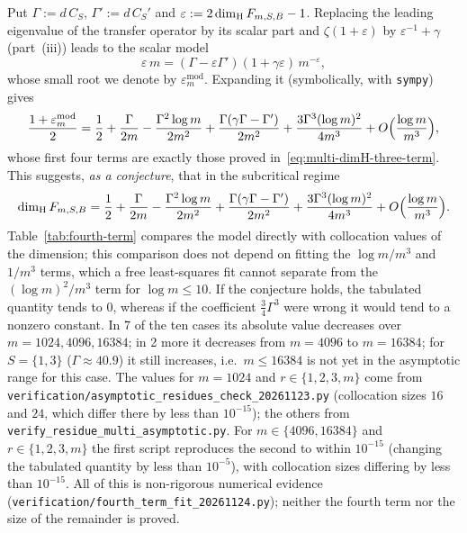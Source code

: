 \begin{remark}\label{rem:fourth-term}
Put $\Gamma:=d\,C_S$, $\Gamma':=d\,C_S'$ and $\varepsilon:=2\dim_{\mathrm{H}} F_{m,S,B}-1$. Replacing the
leading eigenvalue of the transfer operator by its scalar part and $\zeta(1+\varepsilon)$ by
$\varepsilon^{-1}+\gamma$ (part~(iii)) leads to the scalar model
\[
\varepsilon\,m=(\Gamma-\varepsilon\Gamma')(1+\gamma\varepsilon)\,m^{-\varepsilon},
\]
whose small root we denote by $\varepsilon_m^{\mathrm{mod}}$. Expanding it (symbolically, with
\texttt{sympy}) gives
\[
\frac{1+\varepsilon_m^{\mathrm{mod}}}{2}=\frac12+\frac{\Gamma}{2m}-\frac{\Gamma^2\log m}{2m^2}
+\frac{\Gamma(\gamma\Gamma-\Gamma')}{2m^2}+\frac{3\Gamma^3(\log m)^2}{4m^3}
+O\Bigl(\frac{\log m}{m^3}\Bigr),
\]
whose first four terms are exactly those proved in~\eqref{eq:multi-dimH-three-term}. This
suggests, \emph{as a conjecture}, that in the subcritical regime
\[
\dim_{\mathrm{H}} F_{m,S,B}=\frac12+\frac{\Gamma}{2m}-\frac{\Gamma^2\log m}{2m^2}
+\frac{\Gamma(\gamma\Gamma-\Gamma')}{2m^2}+\frac{3\Gamma^3(\log m)^2}{4m^3}
+O\Bigl(\frac{\log m}{m^3}\Bigr).
\]
Table~\ref{tab:fourth-term} compares the model directly with collocation values of the
dimension; this comparison does not depend on fitting the $\log m/m^3$ and $1/m^3$ terms, which a
free least-squares fit cannot separate from the $(\log m)^2/m^3$ term for $\log m\le 10$. If the
conjecture holds, the tabulated quantity tends to $0$, whereas if the coefficient
$\frac34\Gamma^3$ were wrong it would tend to a nonzero constant. In 7 of the ten
cases its absolute value decreases over $m=1024,4096,16384$; in 2 more it
decreases from $m=4096$ to $m=16384$; for $S=\{1,3\}$ ($\Gamma\approx40.9$) it still increases,
i.e.\ $m\le16384$ is not yet in the asymptotic range for this case. The values for $m=1024$
and $r\in\{1,2,3,m\}$ come from \texttt{verification/\allowbreak asymptotic\_\allowbreak residues\_\allowbreak check\_\allowbreak 20261123.py}
(collocation sizes $16$ and $24$, which differ there by less than $10^{-15}$); the others from
\texttt{verify\_\allowbreak residue\_\allowbreak multi\_\allowbreak asymptotic.py}. For $m\in\{4096,16384\}$ and
$r\in\{1,2,3,m\}$ the first script reproduces the second to within $10^{-15}$
(changing the tabulated quantity by less than $10^{-5}$), with
collocation sizes differing by less than $10^{-15}$. All of this is non-rigorous numerical
evidence (\texttt{verification/\allowbreak fourth\_\allowbreak term\_\allowbreak fit\_\allowbreak 20261124.py}); neither the
fourth term nor the size of the remainder is proved.
\end{remark}

